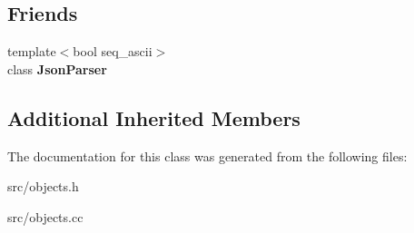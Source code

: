 \subsection*{Friends}
\begin{DoxyCompactItemize}
\item 
\hypertarget{classv8_1_1internal_1_1_string_table_a9f71fbaae144c73b8be1f30630fdb8da}{}{\footnotesize template$<$bool seq\+\_\+ascii$>$ }\\class {\bfseries Json\+Parser}\label{classv8_1_1internal_1_1_string_table_a9f71fbaae144c73b8be1f30630fdb8da}

\end{DoxyCompactItemize}
\subsection*{Additional Inherited Members}


The documentation for this class was generated from the following files\+:\begin{DoxyCompactItemize}
\item 
src/objects.\+h\item 
src/objects.\+cc\end{DoxyCompactItemize}
